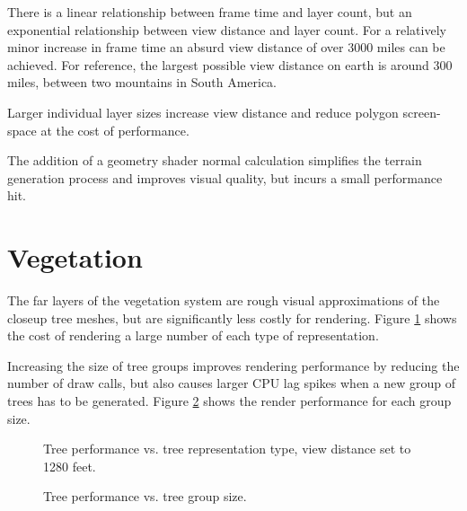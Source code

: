 There is a linear relationship between frame time and layer count, but an exponential relationship between view distance and layer count.
For a relatively minor increase in frame time an absurd view distance of over 3000 miles can be achieved.
For reference, the largest possible view distance on earth is around 300 miles, between two mountains in South America. \cite{viewdistancemaxearth}

Larger individual layer sizes increase view distance and reduce polygon screen-space at the cost of performance.

The addition of a geometry shader normal calculation simplifies the terrain generation process and improves visual quality, but incurs a small performance hit.


\section{Vegetation}

The far layers of the vegetation system are rough visual approximations of the closeup tree meshes, but are significantly less costly for rendering.
Figure \ref{fig:tree_plot_1} shows the cost of rendering a large number of each type of representation.

Increasing the size of tree groups improves rendering performance by reducing the number of draw calls, but also causes larger CPU lag spikes when a new group of trees has to be generated.
Figure \ref{fig:tree_plot_2} shows the render performance for each group size.

\begin{figure}
	\centering
{}
	\caption{
		Tree performance vs. tree representation type, view distance set to 1280 feet.
	}
	\label{fig:tree_plot_1}
\end{figure}

\begin{figure}
	\centering
{}
	\caption{
		Tree performance vs. tree group size.
	}
	\label{fig:tree_plot_2}
\end{figure}


